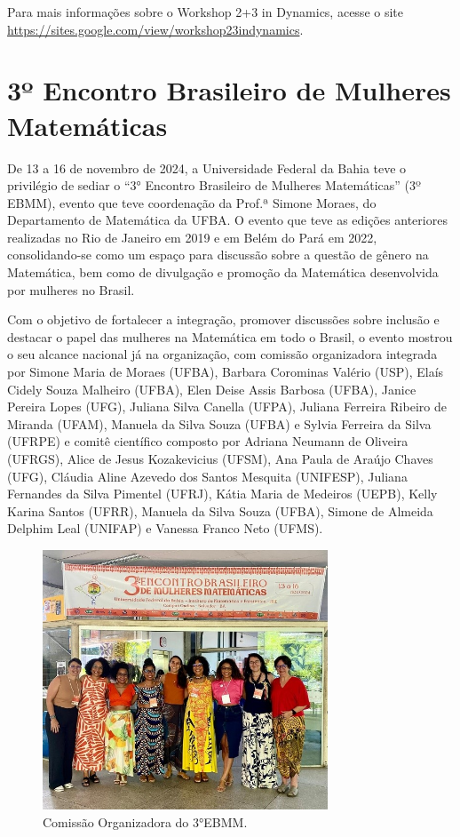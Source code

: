 \documentclass{hipatia}
\begin{document}
Para mais informações sobre o Workshop 2+3 in Dynamics, acesse o site
\href{https://sites.google.com/view/workshop23indynamics}{https://sites.google.com/view/workshop23indynamics}.


\section{3º Encontro Brasileiro de Mulheres Matemáticas }

De 13 a 16 de novembro de 2024, a Universidade Federal da Bahia teve o privilégio de sediar o ``3° Encontro Brasileiro de Mulheres Matemáticas'' (3º EBMM), evento que teve coordenação da Prof.ª Simone Moraes, do Departamento de Matemática da UFBA.
O evento que teve as edições anteriores realizadas no Rio de Janeiro em 2019 e em Belém do Pará em 2022, consolidando-se como um espaço para discussão sobre a questão de gênero na Matemática, bem como de divulgação e promoção da Matemática desenvolvida por mulheres no Brasil.

Com o objetivo de fortalecer a integração, promover discussões sobre inclusão e destacar o papel das mulheres na Matemática em todo o Brasil, o evento mostrou o seu alcance nacional já na organização, com comissão organizadora integrada por Simone Maria de Moraes (UFBA), Barbara Corominas Valério (USP), Elaís Cidely Souza Malheiro (UFBA), Elen Deise Assis Barbosa (UFBA), Janice Pereira Lopes (UFG), Juliana Silva Canella (UFPA), Juliana Ferreira Ribeiro de Miranda (UFAM), Manuela da Silva Souza (UFBA) e Sylvia Ferreira da Silva (UFRPE) e comitê científico composto por Adriana Neumann de Oliveira (UFRGS), Alice de Jesus Kozakevicius (UFSM), Ana Paula de Araújo Chaves (UFG), Cláudia Aline Azevedo dos Santos Mesquita (UNIFESP), Juliana Fernandes da Silva Pimentel (UFRJ), Kátia Maria de Medeiros (UEPB), Kelly Karina Santos (UFRR), Manuela da Silva Souza (UFBA), Simone de Almeida Delphim Leal (UNIFAP) e Vanessa Franco Neto (UFMS).

\begin{figure}[htb]
    \centering
    \includegraphics[width=8.5cm]{EBMM3.jpg}
    \caption{Comissão Organizadora do 3°EBMM.}
 \label{EBMM3}
\end{figure}
\end{document}
